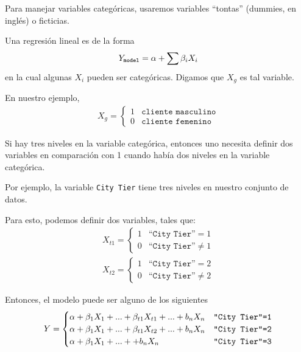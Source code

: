 Para manejar variables categóricas, usaremos variables ``tontas'' (dummies, en inglés) o ficticias.


Una regresión lineal es de la forma
\begin{align}
	Y_{\texttt{model}}=\alpha + \sum \beta_{i}X_{i}
\end{align}
en la cual algunas $X_{i}$ pueden ser categóricas. Digamos que $X_{g}$ es tal variable.


En nuestro ejemplo,
\begin{align}X_{g}=
	\begin{cases}
		1 & \texttt{cliente masculino} \\
		0 & \texttt{cliente femenino}
	\end{cases}
\end{align}


Si hay tres niveles en la variable categórica, entonces uno necesita definir dos
variables en comparación con 1 cuando había dos niveles en la variable categórica.

Por ejemplo, la variable \texttt{City Tier} tiene tres niveles en nuestro conjunto de datos.


Para esto, podemos definir dos variables, tales que:
\begin{align}
	X_{t1}=
	\begin{cases}
		1 & \texttt{``City Tier''}=1 \\
		0 & \texttt{``City Tier''}\neq 1
	\end{cases}
\end{align}
\begin{align}
	X_{t2}=
	\begin{cases}
		1 & \texttt{``City Tier''}=2 \\
		0 & \texttt{``City Tier''}\neq 2
	\end{cases}
\end{align}


Entonces, el modelo puede ser alguno de los siguientes
\begin{align}
	Y=
	\begin{cases}
		\alpha + \beta_{1}X_{1}+...+\beta_{t1}X_{t1}+...+b_{n}X_{n} & \texttt{``City Tier''=1}\\
		\alpha + \beta_{1}X_{1}+...+\beta_{t1}X_{t2}+...+b_{n}X_{n} & \texttt{``City Tier''=2}\\
		\alpha + \beta_{1}X_{1}+...++b_{n}X_{n} & \texttt{``City Tier''=3}\\
	\end{cases}
\end{align}


